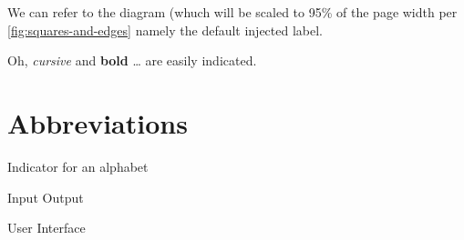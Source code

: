 We can refer to the diagram (whuch will be scaled to 95\% of the page
width per \ref{fig:squares-and-edges} namely the default injected label.

Oh, \emph{cursive} and \textbf{bold} \ldots{} are easily indicated.

\hypertarget{abbreviations}{%
\section{Abbreviations}\label{abbreviations}}

\begin{description}
\tightlist
\item[ABC]
Indicator for an alphabet
\item[IO]
Input Output
\item[UI]
User Interface
\end{description}
